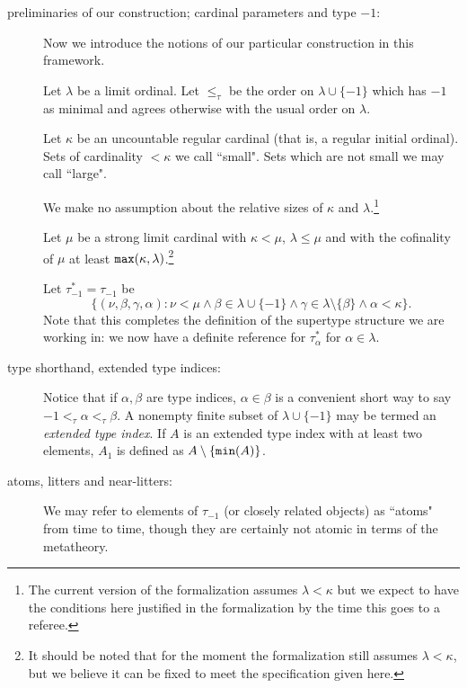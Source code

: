 \documentclass[112pt]{article}
\begin{document}
\begin{description}


\item[preliminaries of our construction;  cardinal parameters and type $-1$:]Now we introduce the notions of our particular construction in this framework.

Let $\lambda$ be a limit ordinal.  Let $\leq_\tau$ be the order on $\lambda \cup \{-1\}$ which has $-1$ as minimal and agrees otherwise with the usual order on $\lambda$.

Let $\kappa$ be an uncountable regular cardinal (that is, a regular initial ordinal).  Sets of cardinality $<\kappa$ we call ``small".  Sets which are not small we may call ``large".

We make no assumption about the relative sizes of $\kappa$ and $\lambda$.\footnote{The current version of the formalization assumes $\lambda<\kappa$ but we expect to have the conditions here justified in the formalization by the time this goes to a referee.}

Let $\mu$ be a strong limit cardinal with $\kappa<\mu$, $\lambda \leq \mu$ and with the cofinality of $\mu$ at least ${\tt max}(\kappa,\lambda)$.\footnote{It should be noted that for the moment the formalization still assumes $\lambda<\kappa$, but we believe it can be fixed to meet the specification given here.}

Let $\tau^*_{-1}=\tau_{-1}$ be $$\{(\nu,\beta,\gamma,\alpha):\nu<\mu \wedge  \beta \in \lambda\cup \{-1\} \wedge \gamma \in \lambda \setminus \{\beta\}\wedge \alpha<\kappa\}.$$  Note that this completes the definition of the supertype structure we are working in:  we now have a definite reference
for $\tau^*_\alpha$ for $\alpha\in \lambda$.





\item[type shorthand, extended type indices:]  Notice that if $\alpha,\beta$ are type indices, $\alpha\in \beta$ is a convenient short way to say $-1 <_\tau \alpha <_\tau \beta$.   A nonempty finite subset of $\lambda \cup \{-1\}$ may be termed an {\em extended type index}.  If $A$ is an extended type index with at least two elements, $A_1$ is defined as $A \setminus \{{\tt min}(A)\}$.

\item[atoms, litters and near-litters:]  

We may refer to elements of $\tau_{-1}$ (or closely related objects) as ``atoms" from time to time, though they are certainly not atomic in terms of the metatheory.


\end{description}
\end{document}
